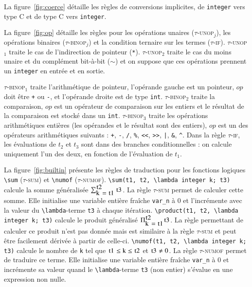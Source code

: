 La figure~\ref{fig:coerce} détaille les règles de conversions implicites, de
\lstinline'integer' vers type C et de type C vers \lstinline'integer'.

La figure~\ref{fig:op} détaille les règles pour les opérations unaires
(\textsc{$\tau$-unop$_{j}$}), les opérations binaires
(\textsc{$\tau$-binop$_{j}$}) et la condition ternaire sur les termes
(\textsc{$\tau$-if}).
\textsc{$\tau$-unop$_1$} traite le cas de l'indirection de pointeur
(\lstinline'*').
\textsc{$\tau$-unop$_2$} traite le cas du moins unaire et du complément
bit-à-bit ($\sim$) et on suppose que ces opérations prennent un
\lstinline'integer' en entrée et en sortie.

\textsc{$\tau$-binop$_1$} traite l'arithmétique de pointeur, l'opérande gauche
est un pointeur, $op$ doit être \lstinline|+| ou \lstinline|-|, et l'opérande
droite est de type \lstinline'int'.
\textsc{$\tau$-binop$_2$} traite la comparaison, $op$ est un opérateur de
comparaison sur les entiers et le résultat de la comparaison est stocké dans un
\lstinline|int|.
\textsc{$\tau$-binop$_3$} traite les opérations arithmétiques entières (les
opérandes et le résultat sont des entiers), $op$ est un des opérateurs
arithmétiques suivants : \lstinline|+|, \lstinline|-|, \lstinline|/|,
\lstinline|%|, \lstinline|<<|, \lstinline|>>|, \lstinline{|}, \lstinline|&|,
\lstinline|^|.
Dans la règle \textsc{$\tau$-if}, les évaluations de $t_2$ et $t_3$ sont dans
des branches conditionnelles : on calcule uniquement l'un des deux, en fonction
de l'évaluation de $t_1$.

La figure~\ref{fig:builtin} présente les règles de traduction pour les fonctions
logiques \lstinline|\sum| (\textsc{$\tau$-sum}) et \lstinline|\numof|
(\textsc{$\tau$-numof}).
\lstinline'\sum(t1, t2, \lambda integer k; t3)' calcule la somme généralisée
$\sum_{\mbox{\lstinline'k = t1'}}^{\mbox{\lstinline't2'}}\mbox{\lstinline't3'}$.
La règle \textsc{$\tau$-sum} permet de calculer cette somme.
Elle initialise une variable entière fraîche \lstinline|var_n| à $0$ et
l'incrémente avec la valeur du \lstinline|\lambda|-terme \lstinline't3' à chaque
itération.
\lstinline'\product(t1, t2, \lambda integer k; t3)' calcule le produit
généralisé $\Pi_{\mbox{\lstinline'k = t1'}}^{\mbox{\lstinline't2'}}\mbox{\lstinline't3'}$.
La règle permettant de calculer ce produit n'est pas donnée mais est similaire à
la règle \textsc{$\tau$-sum} et peut être facilement dérivée à partir de
celle-ci.
\lstinline'\numof(t1, t2, \lambda integer k; t3)' calcule le nombre de
\lstinline'k' tel que
$\mbox{\lstinline't1'} \le \mbox{\lstinline'k'} \le \mbox{\lstinline't2'}$ et
$\mbox{\lstinline't3'} \neq 0$.
La règle \textsc{$\tau$-numof} permet de traduire ce terme.
Elle initialise une variable entière fraîche \lstinline|var_n| à $0$ et
incrémente sa valeur quand le \lstinline|\lambda|-terme \lstinline't3' (non
entier) s'évalue en une expression non nulle.


